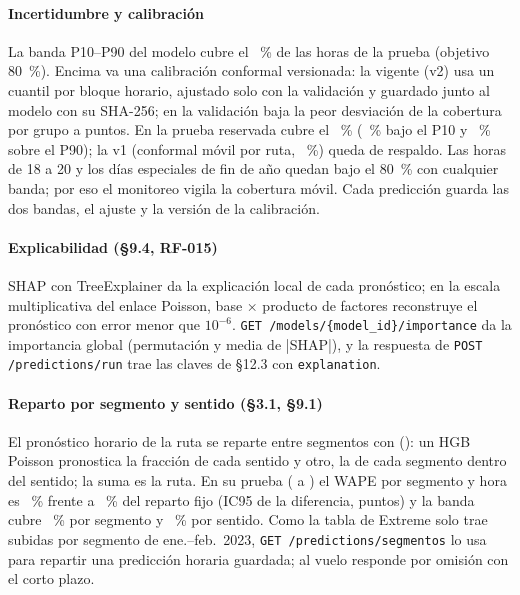 \documentclass[10pt,a4paper]{article}
\begin{document}
\paragraph{Incertidumbre y calibración} La banda P10--P90 del modelo cubre el \CobModelo~\% de las horas de la prueba
(objetivo 80~\%). Encima va una calibración conformal versionada: la vigente (v2) usa un cuantil por bloque horario,
ajustado solo con la validación y guardado junto al modelo con su SHA-256; en la validación baja la peor desviación de
la cobertura por grupo a \CalibPeorDesv{} puntos. En la prueba reservada cubre el \CobVdos~\% (\BajoPdiezVdos~\% bajo
el P10 y \SobrePnoventaVdos~\% sobre el P90); la v1 (conformal móvil por ruta, \CobVuno~\%) queda de respaldo. Las horas de 18 a 20 y los días especiales de fin de año quedan bajo
el 80~\% con cualquier banda; por eso el monitoreo vigila la cobertura móvil. Cada predicción guarda las dos bandas, el
ajuste y la versión de la calibración.

\paragraph{Explicabilidad (§9.4, RF-015)} SHAP con TreeExplainer da la explicación local de cada pronóstico; en la
escala multiplicativa del enlace Poisson, base × producto de factores reconstruye el pronóstico con error menor que
$10^{-6}$. \texttt{GET /models/\{model\_id\}/importance} da la importancia global (permutación y media de |SHAP|), y la
respuesta de \texttt{POST /predictions/run} trae las claves de §12.3 con \texttt{explanation}.

\paragraph{Reparto por segmento y sentido (§3.1, §9.1)} El pronóstico horario de la ruta se reparte entre segmentos
con \texttt{\SegModeloActivo} (): un HGB Poisson pronostica la fracción de
cada sentido y otro, la de cada segmento dentro del sentido; la suma es la ruta. En su prueba (\SegPruebaDesde{} a
\SegPruebaHasta) el WAPE por segmento y hora es \SegWAPEact~\% frente a \SegWAPEbcero~\% del reparto fijo (IC95 de la
diferencia, \SegDifIC{} puntos) y la banda cubre \SegCobSegmento~\% por segmento y \SegCobSentido~\% por sentido. Como
la tabla de Extreme solo trae subidas por segmento de ene.--feb.~2023, \texttt{GET /predictions/segmentos} lo usa para
repartir una predicción horaria guardada; al vuelo responde por omisión con el corto plazo.
\end{document}
